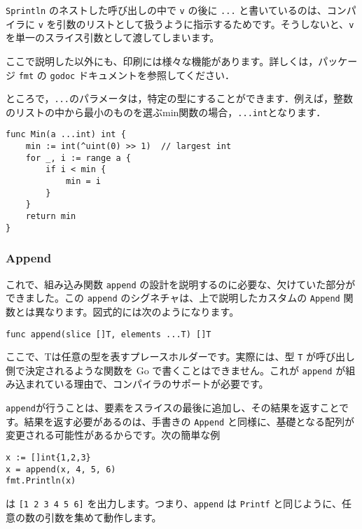 \documentclass{jsarticle}
\begin{document}
\texttt{Sprintln} のネストした呼び出しの中で \texttt{v} の後に
\texttt{...} と書いているのは、コンパイラに \texttt{v}
を引数のリストとして扱うように指示するためです。そうしないと、\texttt{v}
を単一のスライス引数として渡してしまいます。

ここで説明した以外にも、印刷には様々な機能があります。詳しくは，パッケージ
\texttt{fmt} の \texttt{godoc} ドキュメントを参照してください．

ところで，\texttt{...}のパラメータは，特定の型にすることができます．例えば，整数のリストの中から最小のものを選ぶmin関数の場合，\texttt{...int}となります．

\begin{lstlisting}[numbers=none]
func Min(a ...int) int {
    min := int(^uint(0) >> 1)  // largest int
    for _, i := range a {
        if i < min {
            min = i
        }
    }
    return min
}
\end{lstlisting}

\subsubsection{Append}

これで、組み込み関数 \texttt{append}
の設計を説明するのに必要な、欠けていた部分ができました。この
\texttt{append} のシグネチャは、上で説明したカスタムの \texttt{Append}
関数とは異なります。図式的には次のようになります。

\begin{lstlisting}[numbers=none]
func append(slice []T, elements ...T) []T
\end{lstlisting}

ここで、Tは任意の型を表すプレースホルダーです。実際には、型 \texttt{T}
が呼び出し側で決定されるような関数を Go で書くことはできません。これが
\texttt{append}
が組み込まれている理由で、コンパイラのサポートが必要です。

\texttt{append}が行うことは、要素をスライスの最後に追加し、その結果を返すことです。結果を返す必要があるのは、手書きの
\texttt{Append}
と同様に、基礎となる配列が変更される可能性があるからです。次の簡単な例

\begin{lstlisting}[numbers=none]
x := []int{1,2,3}
x = append(x, 4, 5, 6)
fmt.Println(x)
\end{lstlisting}

は \texttt{{[}1\ 2\ 3\ 4\ 5\ 6{]}} を出力します。つまり、\texttt{append}
は \texttt{Printf} と同じように、任意の数の引数を集めて動作します。
\end{document}
